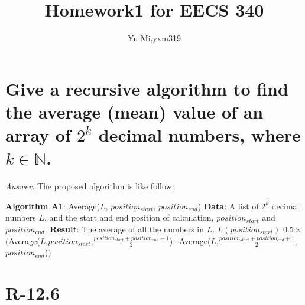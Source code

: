 \documentclass[11pt]{article}
\begin{document}
	\title{Homework1 for EECS 340}
	\author{Yu Mi,yxm319}
	\maketitle
\section{Give a recursive algorithm to find the average (mean) value of an array of $2^k$ decimal numbers, where $k\in \mathbb{N}$.}
	\emph{Answer:} The proposed algorithm is like follow:
	
	\begin{algorithmic}
	\State \textbf{Algorithm A1}: Average($L$, $position_{start}$, $position_{end}$)
	\State \textbf{Data}: A list of $2^k$ decimal numbers $L$, and the start and end position of calculation, $position_{start}$ and $position_{end}$.
	\State \textbf{Result}: The average of all the numbers in $L$.
		\State \Return $L(position_{start})$
	\Else
		\State \Return $0.5\times$ $($Average($L$,$position_{start}$,$\frac{position_{start}+position_{end}-1}{2}$)$+$Average($L$,$\frac{position_{start}+position_{end}+1}{2}$,$position_{end}$)$)$
	\EndIf
	\end{algorithmic}
\section{R-12.6}
	
\end{document}
